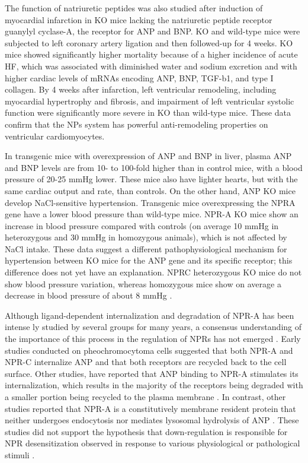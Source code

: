 \documentclass[14pt,a4paper,onecolumn]{extarticle}
\begin{document}
The function of natriuretic peptides was also studied after induction of myocardial infarction in KO mice lacking the natriuretic peptide receptor guanylyl cyclase-A, the receptor for ANP and BNP. KO and wild-type mice were subjected to left coronary artery ligation and then followed-up for 4 weeks. KO mice showed significantly higher mortality because of a higher incidence of acute HF, which was associated with diminished water and sodium excretion and with higher cardiac levels of mRNAs encoding ANP, BNP, TGF-b1, and type I collagen. By 4 weeks after infarction, left ventricular remodeling, including myocardial hypertrophy and fibrosis, and impairment of left ventricular systolic function were significantly more severe in KO than wild-type mice. These data confirm that the NPs system has powerful anti-remodeling properties on ventricular cardiomyocytes.\citep{89} %

In transgenic mice with overexpression of ANP and BNP in liver, plasma ANP and BNP levels are from 10- to 100-fold higher than in control mice, with a blood pressure of 20-25 mmHg lower. These mice also have lighter hearts, but with the same cardiac output and rate, than controls.  On the other hand, ANP KO mice develop NaCl-sensitive hypertension. Transgenic mice overexpressing the NPRA gene have  a lower blood pressure than wild-type mice. NPR-A KO mice show an increase in blood pressure compared with controls (on average 10 mmHg in heterozygous and 30 mmHg in homozygous animals), which is not affected by NaCl intake. These data suggest a different pathophysiological mechanism for hypertension between KO mice for the ANP gene and its specific receptor; this difference does not yet have an explanation. NPRC heterozygous KO mice do not show blood pressure variation, whereas homozygous mice show on average a decrease in blood pressure of about 8 mmHg \citep{251}. %

Although ligand-dependent internalization and degradation of NPR-A has been intense ly studied by several groups for many years, a consensus understanding of the importance of this process in the regulation of NPRs has not emerged \citep{182}. Early studies conducted on pheochromocytoma cells suggested that both NPR-A and NPR-C internalize ANP and that both receptors are recycled back to the cell surface. Other studies, have reported that ANP binding to NPR-A stimulates its internalization, which results in the majority of the receptors being degraded with a smaller portion being recycled to the plasma membrane \citep{186} \citep{187}. In contrast, other studies reported that NPR-A is a constitutively membrane resident protein that neither undergoes endocytosis nor mediates lysosomal hydrolysis of ANP \citep{189}.  These studies did not support the hypothesis that down-regulation is responsible for NPR desensitization observed in response to various physiological or pathological stimuli \citep{182}. %
\end{document}
